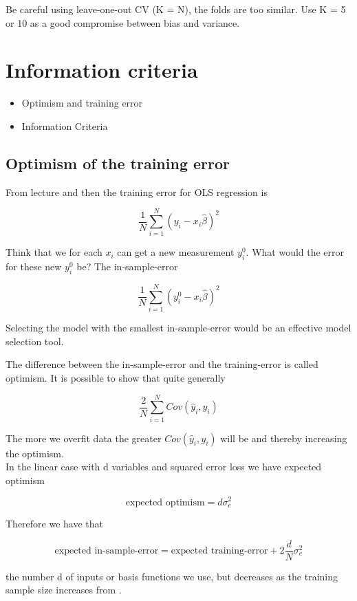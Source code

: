 Be careful using leave-one-out CV (K = N), the folds are too similar.
Use K = 5 or 10 as a good compromise between bias and variance.  \cite[p.~34]{lecture2}

\section{Information criteria}

\begin{itemize}
  \item Optimism and training error
  \item Information Criteria
\end{itemize}

\subsection{Optimism of the training error}

From lecture \cite[p.~37]{lecture2} and \cite[p.~228]{friedman2016elements} then the training error for OLS regression is

\[
    \frac{1}{N} \sum_{i=1}^{N} (y_i - x_i \hat{\beta})^2
\]

Think that we for each $x_i$ can get a new measurement $y_i^0$. What would the error for these new $y_i^0$ be? The in-sample-error

\[
    \frac{1}{N} \sum_{i=1}^{N} (y_i^0 - x_i \hat{\beta})^2
\]

Selecting the model with the smallest in-sample-error would be
an effective model selection tool.

The difference between the in-sample-error and the training-error
is called optimism. It is possible to show that quite generally

\[
    \frac{2}{N} \sum_{i=1}^{N} Cov(\hat{y}_i, y_i)
\]

The more we overfit data the greater $Cov(\hat{y}_i, y_i)$ will be and thereby increasing the optimism.\\

In the linear case with d variables and squared error loss we have expected optimism

\[
    \text{expected optimism} = d \sigma^2_e
\]

Therefore we have that

\[
    \text{expected in-sample-error} = \text{expected training-error} + 2 \frac{d}{N} \sigma^2_e
\]

the number d of inputs or basis functions we use, but decreases as the
training sample size increases from \cite[p.~230]{friedman2016elements}.

